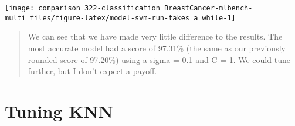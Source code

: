 \documentclass[]{book}
\begin{document}
\begin{center}\texttt{[image: comparison\_322-classification\_BreastCancer-mlbench-multi\_files/figure-latex/model-svm-run-takes\_a\_while-1]} \end{center}

\begin{quote}
We can see that we have made very little diﬀerence to the results. The most accurate model had a score of 97.31\% (the same as our previously rounded score of 97.20\%) using a sigma = 0.1 and C = 1. We could tune further, but I don't expect a payoﬀ.
\end{quote}

\hypertarget{tuning-knn}{%
\section{Tuning KNN}\label{tuning-knn}}
\end{document}
